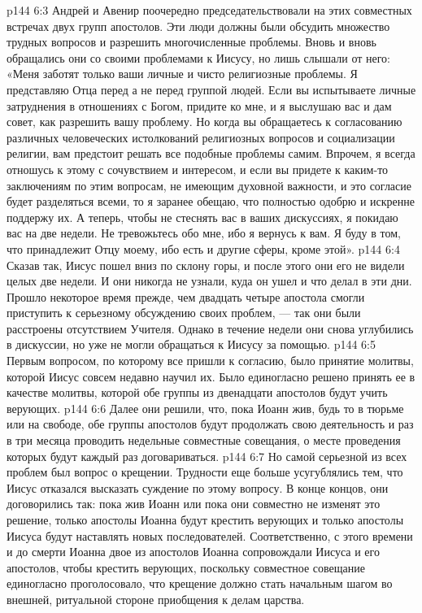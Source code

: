 \vs p144 6:3 Андрей и Авенир поочередно председательствовали на этих совместных встречах двух групп апостолов. Эти люди должны были обсудить множество трудных вопросов и разрешить многочисленные проблемы. Вновь и вновь обращались они со своими проблемами к Иисусу, но лишь слышали от него: «Меня заботят только ваши личные и чисто религиозные проблемы. Я представляю Отца перед  а не перед группой людей. Если вы испытываете личные затруднения в отношениях с Богом, придите ко мне, и я выслушаю вас и дам совет, как разрешить вашу проблему. Но когда вы обращаетесь к согласованию различных человеческих истолкований религиозных вопросов и социализации религии, вам предстоит решать все подобные проблемы самим. Впрочем, я всегда отношусь к этому с сочувствием и интересом, и если вы придете к каким\hyp{}то заключениям по этим вопросам, не имеющим духовной важности, и это согласие будет разделяться всеми, то я заранее обещаю, что полностью одобрю и искренне поддержу их. А теперь, чтобы не стеснять вас в ваших дискуссиях, я покидаю вас на две недели. Не тревожьтесь обо мне, ибо я вернусь к вам. Я буду в том, что принадлежит Отцу моему, ибо есть и другие сферы, кроме этой».
\vs p144 6:4 Сказав так, Иисус пошел вниз по склону горы, и после этого они его не видели целых две недели. И они никогда не узнали, куда он ушел и что делал в эти дни. Прошло некоторое время прежде, чем двадцать четыре апостола смогли приступить к серьезному обсуждению своих проблем, --- так они были расстроены отсутствием Учителя. Однако в течение недели они снова углубились в дискуссии, но уже не могли обращаться к Иисусу за помощью.
\vs p144 6:5 Первым вопросом, по которому все пришли к согласию, было принятие молитвы, которой Иисус совсем недавно научил их. Было единогласно решено принять ее в качестве молитвы, которой обе группы из двенадцати апостолов будут учить верующих.
\vs p144 6:6 Далее они решили, что, пока Иоанн жив, будь то в тюрьме или на свободе, обе группы апостолов будут продолжать свою деятельность и раз в три месяца проводить недельные совместные совещания, о месте проведения которых будут каждый раз договариваться.
\vs p144 6:7 Но самой серьезной из всех проблем был вопрос о крещении. Трудности еще больше усугублялись тем, что Иисус отказался высказать суждение по этому вопросу. В конце концов, они договорились так: пока жив Иоанн или пока они совместно не изменят это решение, только апостолы Иоанна будут крестить верующих и только апостолы Иисуса будут наставлять новых последователей. Соответственно, с этого времени и до смерти Иоанна двое из апостолов Иоанна сопровождали Иисуса и его апостолов, чтобы крестить верующих, поскольку совместное совещание единогласно проголосовало, что крещение должно стать начальным шагом во внешней, ритуальной стороне приобщения к делам царства.
